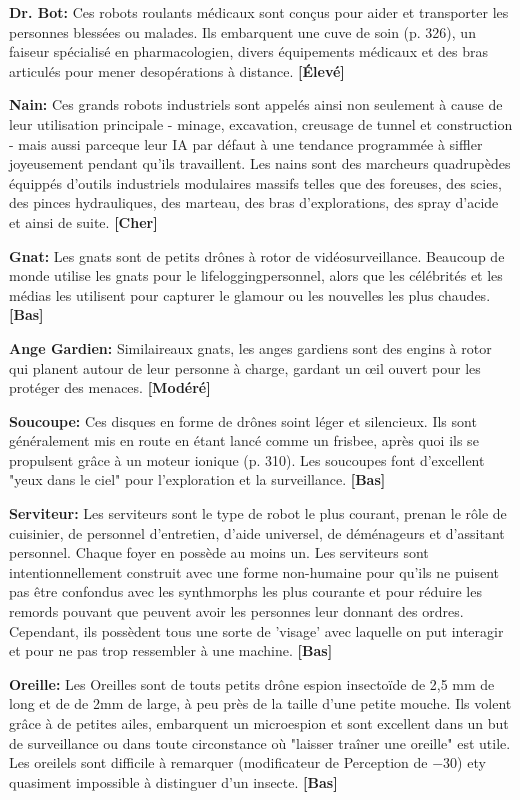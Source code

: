 {\textbf{Dr. Bot:} Ces robots roulants médicaux sont conçus pour aider et transporter les personnes blessées ou malades. Ils embarquent une cuve de soin (p. 326), un faiseur spécialisé en pharmacologien, divers équipements médicaux et des bras articulés pour mener desopérations à distance. \textbf{[Élevé]} 

\textbf{Nain:} Ces grands robots industriels sont appelés ainsi non seulement à cause de leur utilisation principale - minage, excavation, creusage de tunnel et construction - mais aussi parceque leur IA par défaut à une tendance programmée à siffler joyeusement pendant qu'ils travaillent. Les nains sont des marcheurs quadrupèdes équippés d'outils industriels modulaires massifs telles que des foreuses, des scies, des pinces hydrauliques, des marteau, des bras d'explorations, des spray d'acide et ainsi de suite. \textbf{[Cher]} 

\textbf{Gnat:} Les gnats sont de petits drônes à rotor de vidéosurveillance. Beaucoup de monde utilise les gnats pour le lifeloggingpersonnel, alors que les célébrités et les médias les utilisent pour capturer le glamour ou les nouvelles les plus chaudes. \textbf{[Bas]} 

\textbf{Ange Gardien:} Similaireaux gnats, les anges gardiens sont des engins à rotor qui planent autour de leur personne à charge, gardant un œil ouvert pour les protéger des menaces. \textbf{[Modéré]} 

\textbf{Soucoupe:} Ces disques en forme de drônes soint léger et silencieux. Ils sont généralement mis en route en étant lancé comme un frisbee, après quoi ils se propulsent grâce à un moteur ionique (p. 310). Les soucoupes font d'excellent "yeux dans le ciel" pour l'exploration et la surveillance. \textbf{[Bas]} 

\textbf{Serviteur:} Les serviteurs sont le type de robot le plus courant, prenan le rôle de cuisinier, de personnel d'entretien, d'aide universel, de déménageurs et d'assitant personnel. Chaque foyer en possède au moins un. Les serviteurs sont intentionnellement construit avec une forme non-humaine pour qu'ils ne puisent pas être confondus avec les synthmorphs les plus courante et pour réduire les remords pouvant que peuvent avoir les personnes leur donnant des ordres. Cependant, ils possèdent tous une sorte de 'visage' avec laquelle on put interagir et pour ne pas trop ressembler à une machine. \textbf{[Bas]} 

\textbf{Oreille:} Les Oreilles sont de touts petits drône espion insectoïde de 2,5 mm de long et de de 2mm de large, à peu près de la taille d'une petite mouche. Ils volent grâce à de petites ailes, embarquent un microespion et sont excellent dans un but de surveillance ou dans toute circonstance où "laisser traîner une oreille" est utile. Les oreilels sont difficile à remarquer (modificateur de Perception de $-$30) ety quasiment impossible à distinguer d'un insecte. \textbf{[Bas]} 

}
